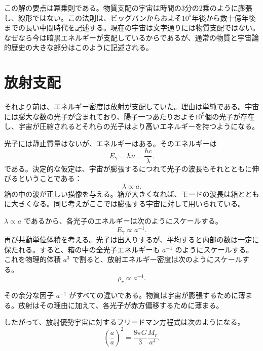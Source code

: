 この解の要点は冪乗則である。物質支配の宇宙は時間の3分の2乗のように膨張し、線形ではない。この法則は、ビッグバンからおよそ\(10^5\)年後から数十億年後までの長い中間時代を記述する。現在の宇宙は文字通りには物質支配ではない。なぜなら今は暗黒エネルギーが支配しているからであるが、通常の物質と宇宙論的歴史の大きな部分はこのように記述される。

\section{放射支配}

それより前は、エネルギー密度は放射が支配していた。理由は単純である。宇宙には膨大な数の光子が含まれており、陽子一つあたりおよそ\(10^9\)個の光子が存在し、宇宙が圧縮されるとそれらの光子はより高いエネルギーを持つようになる。

光子には静止質量はないが、エネルギーはある。そのエネルギーは
\begin{equation}
E_\gamma=h\nu=\frac{hc}{\lambda}.
\end{equation}
である。決定的な仮定は、宇宙が膨張するにつれて光子の波長もそれとともに伸びるということである：
\begin{equation}
\lambda\propto a.
\end{equation}
箱の中の波が正しい描像を与える。箱が大きくなれば、モードの波長は箱とともに大きくなる。同じ考えがここでは膨張する宇宙に対して用いられている。

\(\lambda\propto a\) であるから、各光子のエネルギーは次のようにスケールする。
\begin{equation}
E_\gamma\propto a^{-1}.
\end{equation}
再び共動単位体積を考える。光子は出入りするが、平均すると内部の数は一定に保たれる。すると、箱の中の全光子エネルギーも \(a^{-1}\) のようにスケールする。これを物理的体積 \(a^3\) で割ると、放射エネルギー密度は次のようにスケールする。
\begin{equation}
\rho_r\propto a^{-4}.
\end{equation}

その余分な因子 \(a^{-1}\) がすべての違いである。物質は宇宙が膨張するために薄まる。放射はその理由に加えて、各光子が赤方偏移するために薄まる。

したがって、放射優勢宇宙に対するフリードマン方程式は次のようになる。
\begin{equation}
\left(\frac{\dot a}{a}\right)^2=\frac{8\pi G}{3}\frac{M_r}{a^4}.
\end{equation}

